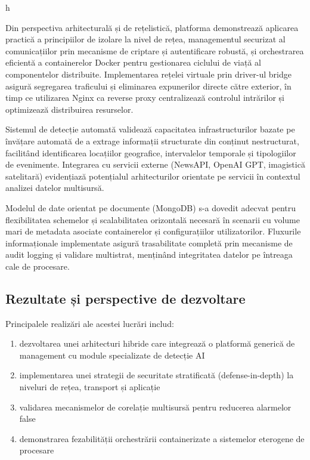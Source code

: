 h\documentclass[12pt,a4paper]{article}
\begin{document}
Din perspectiva arhitecturală și de rețelistică, platforma demonstrează aplicarea practică a principiilor de izolare la nivel de rețea, managementul securizat al comunicațiilor prin mecanisme de criptare și autentificare robustă, și orchestrarea eficientă a containerelor Docker pentru gestionarea ciclului de viață al componentelor distribuite. Implementarea rețelei virtuale prin driver-ul bridge asigură segregarea traficului și eliminarea expunerilor directe către exterior, în timp ce utilizarea Nginx ca reverse proxy centralizează controlul intrărilor și optimizează distribuirea resurselor.

Sistemul de detecție automată validează capacitatea infrastructurilor bazate pe învățare automată de a extrage informații structurate din conținut nestructurat, facilitând identificarea locațiilor geografice, intervalelor temporale și tipologiilor de evenimente. Integrarea cu servicii externe (NewsAPI, OpenAI GPT, imagistică satelitară) evidențiază potențialul arhitecturilor orientate pe servicii în contextul analizei datelor multisursă.

Modelul de date orientat pe documente (MongoDB) s-a dovedit adecvat pentru flexibilitatea schemelor și scalabilitatea orizontală necesară în scenarii cu volume mari de metadata asociate containerelor și configurațiilor utilizatorilor. Fluxurile informaționale implementate asigură trasabilitate completă prin mecanisme de audit logging și validare multistrat, menținând integritatea datelor pe întreaga cale de procesare.

\subsection{Rezultate și perspective de dezvoltare}
 \hspace{1em} Principalele realizări ale acestei lucrări includ: 
 \begin{enumerate}
     \item dezvoltarea unei arhitecturi hibride care integrează o platformă generică de management cu module specializate de detecție AI
     \item implementarea unei strategii de securitate stratificată (defense-in-depth) la niveluri de rețea, transport și aplicație
     \item validarea mecanismelor de corelație multisursă pentru reducerea alarmelor false
     \item demonstrarea fezabilității orchestrării containerizate a sistemelor eterogene de procesare
 \end{enumerate}
\end{document}
